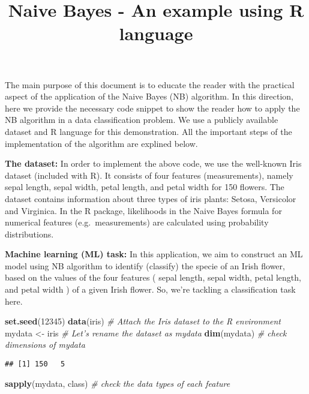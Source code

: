 \documentclass[]{article}
\title{Naive Bayes - An example using R language}
\author{}
\date{}
\newenvironment{Shaded}{\begin{snugshade}}{\end{snugshade}}
\newcommand{\CommentTok}[1]{\textcolor[rgb]{0.56,0.35,0.01}{\textit{#1}}}
\newcommand{\DecValTok}[1]{\textcolor[rgb]{0.00,0.00,0.81}{#1}}
\newcommand{\KeywordTok}[1]{\textcolor[rgb]{0.13,0.29,0.53}{\textbf{#1}}}
\newcommand{\NormalTok}[1]{#1}
\newcommand{\StringTok}[1]{\textcolor[rgb]{0.31,0.60,0.02}{#1}}
\begin{document}
\maketitle

The main purpose of this document is to educate the reader with the
practical aspect of the application of the Naive Bayes (NB) algorithm.
In this direction, here we provide the necessary code snippet to show
the reader how to apply the NB algorithm in a data classification
problem. We use a publicly available dataset and R language for this
demonstration. All the important steps of the implementation of the
algorithm are explined below.

\textbf{The dataset:} In order to implement the above code, we use the
well-known Iris dataset (included with R). It consists of four features
(measurements), namely sepal length, sepal width, petal length, and
petal width for 150 ﬂowers. The dataset contains information about three
types of iris plants: Setosa, Versicolor and Virginica. In the R
package, likelihoods in the Naive Bayes formula for numerical features
(e.g.~measurements) are calculated using probability distributions.

\textbf{Machine learning (ML) task:} In this application, we aim to
construct an ML model using NB algorithm to identify (classify) the
specie of an Irish flower, based on the values of the four features (
sepal length, sepal width, petal length, and petal width ) of a given
Irish flower. So, we're tackling a classification task here.

\begin{Shaded}
\begin{Highlighting}[]
\KeywordTok{set.seed}\NormalTok{(}\DecValTok{12345}\NormalTok{)}
\KeywordTok{data}\NormalTok{(iris) }\CommentTok{# Attach the Iris dataset to the R environment}
\NormalTok{mydata <-}\StringTok{ }\NormalTok{iris }\CommentTok{# Let's rename the dataset as mydata}
\KeywordTok{dim}\NormalTok{(mydata) }\CommentTok{# check dimensions of mydata}
\end{Highlighting}
\end{Shaded}

\begin{verbatim}
## [1] 150   5
\end{verbatim}

\begin{Shaded}
\begin{Highlighting}[]
\KeywordTok{sapply}\NormalTok{(mydata, class) }\CommentTok{# check the data types of each feature}
\end{Highlighting}
\end{Shaded}
\end{document}
